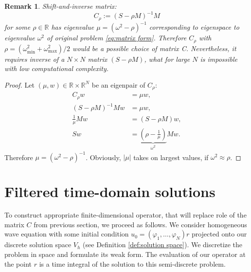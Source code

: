 \documentclass[a4paper,11pt,bibliography=totoc,listof=totoc,headinclude=true,cleardoublepage=empty,oneside]{scrbook}
\newtheorem{rem}[theorem]{Remark}
\newcommand{\R}{\mathbb{R}}
\begin{document}
\begin{rem}
    Shift-and-inverse matrix:
    \begin{equation*}
        C_\rho := (S - \rho M)^{-1}M
    \end{equation*}
    for some $\rho \in \R$ has eigenvalue $\mu = (\omega^2 - \rho)^{-1}$ corresponding to eigenspace to eigenvalue $\omega^2$ of original problem \eqref{eq:matrix form}. Therefore $C_\rho$ with $\rho = (\omega^2_{\min}+\omega^2_{\max})/2 $ would be a possible choice of matrix C. Nevertheless, it requires inverse of a $N\times N$ matrix $(S - \rho M)$, what for large $N$ is impossible with low computational complexity.
\end{rem}
\begin{proof}
    Let $(\mu, w)\in \R\times\R^N$ be an eigenpair of $C_\rho$:
    \begin{align*}
        C_\rho w &= \mu w,  \\
        (S - \rho M)^{-1}Mw &= \mu w, \\
        \frac{1}{\mu}Mw &= (S - \rho M)w, \\
        Sw &= \underbrace{\left(\rho - \frac{1}{\mu}\right)}_{\omega^2} Mw. 
    \end{align*}
    Therefore $\mu = (\omega^2 - \rho)^{-1}$. Obviously, $|\mu|$ takes on largest values, if $\omega^2 \approx \rho$.
\end{proof}

\section{Filtered time-domain solutions}
To construct appropriate finite-dimensional operator, that will replace role of the matrix $C$ from previous section, we proceed as follows. We consider homogeneous wave equation with some initial condition $u_0 = (\varphi_1, \dots, \varphi_N)r$ projected onto our discrete solution space $V_h$ (see Definition \ref{def:solution space}). We discretize the problem in space and formulate its weak form. The evaluation of our operator at the point $r$ is a time integral of the solution to this semi-discrete problem.
\end{document}
